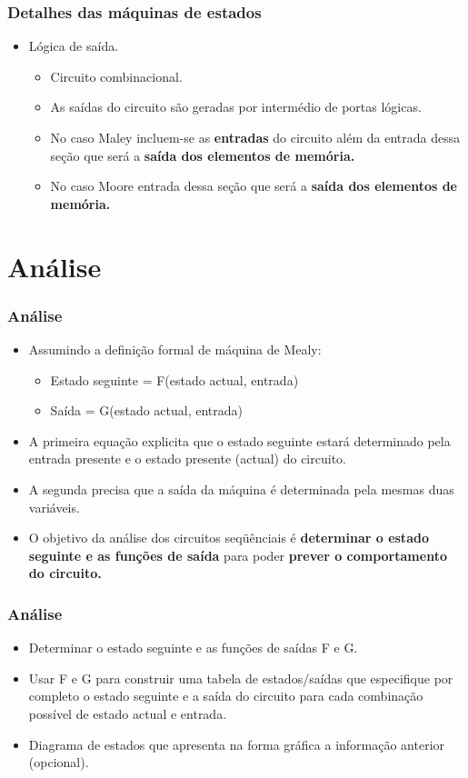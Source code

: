 \documentclass{beamer}
\begin{document}
\begin{frame}
 \frametitle{Detalhes das máquinas de estados}
  \begin{itemize}
   \item Lógica de saída.\pause
   \begin{itemize}
    \item Circuito combinacional.\pause
    \item As saídas do circuito são geradas por intermédio de portas lógicas.\pause
    \item No caso Maley incluem-se as \textbf{entradas} do circuito além da entrada dessa seção que será a \textbf{saída dos elementos de memória.} \pause
    \item No caso Moore entrada dessa seção que será a \textbf{saída dos elementos de memória.}
   \end{itemize}
  \end{itemize}
\end{frame}

\section{Análise}
\begin{frame}
 \frametitle{Análise}
  \begin{itemize}
   \item Assumindo a definição formal de máquina de Mealy:\pause
    \begin{itemize}
     \item Estado seguinte = F(estado actual, entrada)\pause
     \item Saída = G(estado actual, entrada)\pause
    \end{itemize}
   \item A primeira equação explicita que o estado seguinte estará determinado pela entrada presente e o estado presente (actual)  do circuito.\pause
   \item A segunda precisa que a saída da máquina é determinada pela mesmas duas  variáveis.\pause
   \item O objetivo da análise dos circuitos seqüênciais é \textbf{determinar o estado seguinte e as funções de saída}  para poder \textbf{prever o comportamento do circuito.}
  \end{itemize}
\end{frame}

\begin{frame}
 \frametitle{Análise}
 \begin{itemize}
  \item Determinar o estado seguinte e as funções de saídas F e G.\pause
  \item Usar F e G para construir uma tabela de estados/saídas que especifique por completo o estado seguinte e a saída do circuito para cada combinação possível de estado 
	actual e entrada.\pause
  \item Diagrama de estados que apresenta na forma gráfica a informação anterior (opcional). 
 \end{itemize}
\end{frame}
\end{document}
